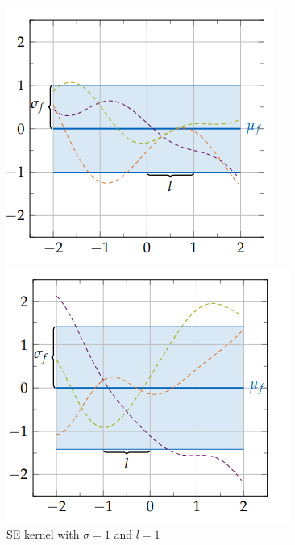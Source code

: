 \documentclass[12pt,a4paper]{report}
\theoremstyle{definition}
\begin{document}
\begin{figure}[H]
   	 \begin{minipage}[t]{0.3\textwidth}
	 	\includegraphics[width=\linewidth]{RBF_sigma_1_lengthscale_1.png}
	    	\caption{SE kernel with $\sigma=1$ and $l=1$ \citep{Kaiser2017}}
	    	\label{fig:SEKernSig1Length1}
	\end{minipage}
	\hfill
	\begin{minipage}[t]{0.3\textwidth}
	 	\includegraphics[width=\linewidth]{RBF_sigma_root2_lengthscale_1.png}

\end{minipage}
\end{figure}
\end{document}
